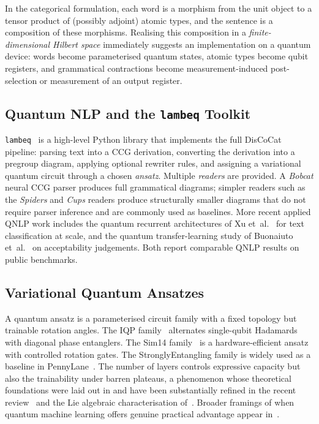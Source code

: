 \documentclass[runningheads]{llncs}
\begin{document}
In the categorical formulation, each word is a morphism from the unit
object to a tensor product of (possibly adjoint) atomic types, and the
sentence is a composition of these morphisms. Realising this composition
in a \emph{finite-dimensional Hilbert space} immediately suggests an
implementation on a quantum device: words become parameterised quantum
states, atomic types become qubit registers, and grammatical contractions
become measurement-induced post-selection or measurement of an output
register.

\subsection{Quantum NLP and the \texttt{lambeq} Toolkit}

\texttt{lambeq}~\cite{kartsaklis2021} is a high-level Python library that
implements the full DisCoCat pipeline: parsing text into a CCG derivation,
converting the derivation into a pregroup diagram, applying optional
rewriter rules, and assigning a variational quantum circuit through a
chosen \emph{ansatz}. Multiple \emph{readers} are provided. A \emph{Bobcat}
neural CCG parser produces full grammatical diagrams; simpler readers such
as the \emph{Spiders} and \emph{Cups} readers produce structurally smaller
diagrams that do not require parser inference and are commonly used as
baselines. More recent applied QNLP work includes the quantum recurrent
architectures of Xu et~al.~\cite{xu2024} for text classification at scale,
and the quantum transfer-learning study of
Buonaiuto et~al.~\cite{buonaiuto2024} on acceptability judgements. Both
report comparable QNLP results on public benchmarks.

\subsection{Variational Quantum Ansatzes}

A quantum ansatz is a parameterised circuit family with a fixed topology
but trainable rotation angles. The IQP family~\cite{havlicek2019} alternates
single-qubit Hadamards with diagonal phase entanglers. The Sim14
family~\cite{sim2019} is a hardware-efficient ansatz with controlled rotation
gates. The StronglyEntangling family is widely used as a baseline in
PennyLane~\cite{bergholm2018}. The number of layers controls expressive
capacity but also the trainability under barren plateaus, a phenomenon
whose theoretical foundations were laid out in \cite{mcclean2018} and
have been substantially refined in the recent
review~\cite{larocca2025} and the Lie algebraic characterisation
of~\cite{ragone2024}. Broader framings of when quantum machine
learning offers genuine practical advantage appear
in~\cite{cerezo2022qml,schuld2022advantage}.
\end{document}
